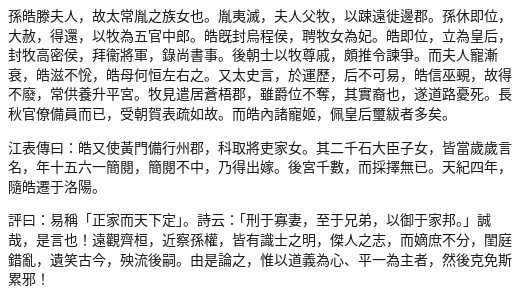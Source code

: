 
\begin{pinyinscope}
孫皓滕夫人，故太常胤之族女也。胤夷滅，夫人父牧，以踈遠徙邊郡。孫休即位，大赦，得還，以牧為五官中郎。皓旣封烏程侯，聘牧女為妃。皓即位，立為皇后，封牧高密侯，拜衞將軍，錄尚書事。後朝士以牧尊戚，頗推令諫爭。而夫人寵漸衰，皓滋不恱，皓母何恒左右之。又太史言，於運歷，后不可易，皓信巫覡，故得不廢，常供養升平宮。牧見遣居蒼梧郡，雖爵位不奪，其實裔也，遂道路憂死。長秋官僚備員而已，受朝賀表疏如故。而皓內諸寵姬，佩皇后璽紱者多矣。

江表傳曰：皓又使黃門備行州郡，科取將吏家女。其二千石大臣子女，皆當歲歲言名，年十五六一簡閱，簡閱不中，乃得出嫁。後宮千數，而採擇無已。天紀四年，隨皓遷于洛陽。

評曰：易稱「正家而天下定」。詩云：「刑于寡妻，至于兄弟，以御于家邦。」誠哉，是言也！遠觀齊桓，近察孫權，皆有識士之明，傑人之志，而嫡庶不分，閨庭錯亂，遺笑古今，殃流後嗣。由是論之，惟以道義為心、平一為主者，然後克免斯累邪！


\end{pinyinscope}